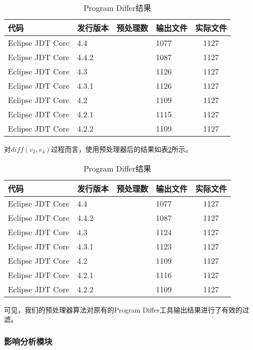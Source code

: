 \begin{table}[H]
	\caption{Program Differ结果}
	\label{data_differ_1}
	\centering
	\begin{tabular}{llllc}
		\toprule[1.5pt]
		{\heiti 代码} & {\heiti 发行版本} & {\heiti 预处理数} & {\heiti 输出文件} & {\heiti 实际文件} \\\midrule[1pt]
		Eclipse JDT Core & 4.4	& & 1077 & 1127	\\		
		Eclipse JDT Core & 4.4.2 	&  & 1087 & 1127		\\
		Eclipse JDT Core & 4.3 	& & 1126 & 1127			\\
		Eclipse JDT Core & 4.3.1 & & 1126 & 1127			\\
		Eclipse JDT Core & 4.2 		& & 1109 & 1127		\\
		Eclipse JDT Core & 4.2.1 & & 1115 & 1127			\\
		Eclipse JDT Core & 4.2.2	& & 1109 & 1127		\\
		\bottomrule[1.5pt]
	\end{tabular}
\end{table}


对$diff(v_2,v_4)$过程而言，使用预处理器后的结果如表\ref {data_differ_3}所示。

\begin{table}[H]
	\caption{Program Differ结果}
	\label{data_differ_3}
	\centering
	\begin{tabular}{llllc}
		\toprule[1.5pt]
		{\heiti 代码} & {\heiti 发行版本} & {\heiti 预处理数} &{\heiti 输出文件} & {\heiti 实际文件} \\\midrule[1pt]
		Eclipse JDT Core & 4.4	& & 1077 & 1127			\\		
		Eclipse JDT Core & 4.4.2 & & 1087 & 1127			\\
		Eclipse JDT Core & 4.3 	& & 1124 & 1127			\\
		Eclipse JDT Core & 4.3.1 	& & 1123 & 1127		\\
		Eclipse JDT Core & 4.2 		& & 1109 & 1127		\\
		Eclipse JDT Core & 4.2.1 	& & 1116 & 1127		\\
		Eclipse JDT Core & 4.2.2	& & 1109 & 1127		\\
		\bottomrule[1.5pt]
	\end{tabular}
\end{table}

可见，我们的预处理器算法对原有的Program Differ工具输出结果进行了有效的过滤。

\subsubsection{影响分析模块}


